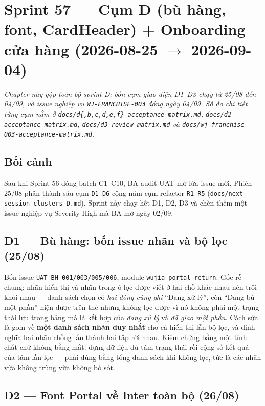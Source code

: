 \chapter{Sprint 57 --- Cụm D (bù hàng, font, CardHeader) + Onboarding cửa hàng (2026-08-25 $\to$ 2026-09-04)}

\emph{Chapter này gộp toàn bộ sprint D: bốn cụm giao diện D1--D3 chạy từ 25/08 đến 04/09,
và issue nghiệp vụ \texttt{WJ-FRANCHISE-003} đóng ngày 04/09. Số đo chi tiết từng cụm nằm ở
\texttt{docs/d\{,b,c,d,e,f\}-acceptance-matrix.md}, \texttt{docs/d2-acceptance-matrix.md},
\texttt{docs/d3-review-matrix.md} và \texttt{docs/wj-franchise-003-acceptance-matrix.md}.}

\section{Bối cảnh}

Sau khi Sprint 56 đóng batch C1--C10, BA audit UAT mở lứa issue mới. Phiên 25/08 phân thành
sáu cụm \texttt{D1--D6} cộng năm cụm refactor \texttt{R1--R5}
(\texttt{docs/next-session-clusters-D.md}). Sprint này chạy hết D1, D2, D3 và chèn thêm một
issue nghiệp vụ Severity High mà BA mở ngày 02/09.

\section{D1 --- Bù hàng: bốn issue nhãn và bộ lọc (25/08)}

Bốn issue \texttt{UAT-BH-001/003/005/006}, module \texttt{wujia\_portal\_return}. Gốc rễ
chung: nhãn hiển thị và nhãn trong ô lọc được viết ở hai chỗ khác nhau nên trôi khỏi nhau ---
danh sách chọn có \emph{hai dòng cùng ghi} ``Đang xử lý'', còn ``Đang bù một phần'' hiện được
trên thẻ nhưng không lọc được vì nó không phải một trạng thái lưu trong bảng mà là kết hợp
của \emph{đang xử lý} và \emph{đã giao một phần}. Cách sửa là gom về \textbf{một danh sách
nhãn duy nhất} cho cả hiển thị lẫn bộ lọc, và định nghĩa hai nhãn chồng lấn thành hai tập
rời nhau. Kiểm chứng bằng một tính chất chứ không bằng mắt: dựng dữ liệu đủ tám trạng thái
rồi cộng số kết quả của tám lần lọc --- phải đúng bằng tổng danh sách khi không lọc, tức là
các nhãn vừa không trùng vừa không bỏ sót.

\section{D2 --- Font Portal về Inter toàn bộ (26/08)}

